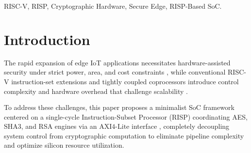 \begin{abstract}

The rapid proliferation of IoT edge applications demands compact, energy-efficient SoCs capable of operating under strict constraints. To avoid the hardware overhead of conventional cryptographic ISA or pipeline extensions, this paper presents a RISP-based SoC framework integrating a minimalist single-cycle processor core with dedicated AES, $\text{SHA}3$, and RSA cryptographic engines via an $\text{AXI}4\text{-}\text{Lite}$ interface. Implemented on a Xilinx $\text{Zynq}\text{-}\text{7000}$ FPGA, the RISP core minimizes control logic to just $1,126\text{ }\text{LUTs}$ and $175\text{ }\text{FFs}$. Benchmarked against $\text{RV}32\text{I}$ and Ibex baselines, the RISP-based SoC reduces total power to $0.407\text{ }\text{W}$ ($0.298\text{ }\text{W}$ dynamic) and drastically cuts cycle counts across all cryptographic workloads. Specifically, it achieves $58.18 Mb/s$ in $\text{AES}\text{-}128$ ECB mode ($88\text{ }\text{cycles}$), completes 16-block $\text{SHA}3\text{-}256$ in $6,871\text{ }\text{cycles}$, and delivers $3265.89\text{ }\mu\text{J/bit}$ energy efficiency with $306.19$ verifications per second per Watt ($\text{verifications} \cdot \text{s}^{-1} \cdot \text{W}^{-1}$) for $\text{RSA}\text{-}2048$. The proposed architecture provides an optimal hardware offloading paradigm for energy-constrained secure edge computing.

\end{abstract}


\begin{IEEEkeywords}
RISC-V, RISP, Cryptographic Hardware, Secure Edge, RISP-Based SoC.
\end{IEEEkeywords}

\section{Introduction}
\label{sec:intro}

The rapid expansion of edge IoT applications necessitates hardware-assisted security under strict power, area, and cost constraints \cite{wang2021energy}, while conventional RISC-V instruction-set extensions and tightly coupled coprocessors introduce control complexity and hardware overhead that challenge scalability \cite{wang2021energy, pham2026sha, pham2024secure, ignatius2024power}.

To address these challenges, this paper proposes a minimalist SoC framework centered on a single-cycle Instruction-Subset Processor (RISP) coordinating AES, $\text{SHA}3$, and RSA engines via an $\text{AXI}4\text{-}\text{Lite}$ interface \cite{raissp2025}, completely decoupling system control from cryptographic computation to eliminate pipeline complexity and optimize silicon resource utilization.


